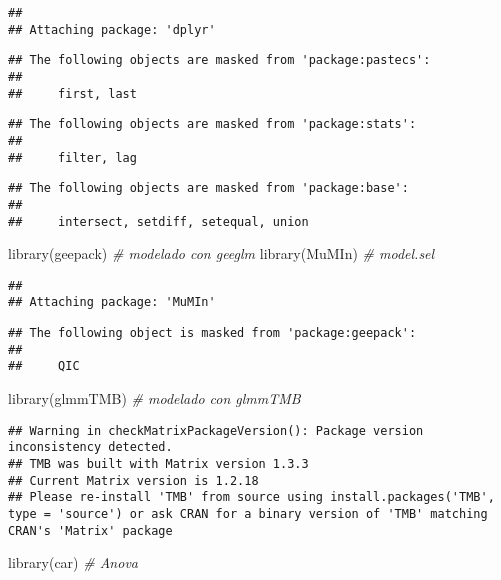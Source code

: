 \documentclass[
]{article}
\newenvironment{Shaded}{\begin{snugshade}}{\end{snugshade}}
\newcommand{\CommentTok}[1]{\textcolor[rgb]{0.56,0.35,0.01}{\textit{#1}}}
\newcommand{\FunctionTok}[1]{\textcolor[rgb]{0.00,0.00,0.00}{#1}}
\newcommand{\NormalTok}[1]{#1}
\begin{document}
\begin{verbatim}
## 
## Attaching package: 'dplyr'
\end{verbatim}

\begin{verbatim}
## The following objects are masked from 'package:pastecs':
## 
##     first, last
\end{verbatim}

\begin{verbatim}
## The following objects are masked from 'package:stats':
## 
##     filter, lag
\end{verbatim}

\begin{verbatim}
## The following objects are masked from 'package:base':
## 
##     intersect, setdiff, setequal, union
\end{verbatim}

\begin{Shaded}
\begin{Highlighting}[]
\FunctionTok{library}\NormalTok{(geepack)   }\CommentTok{\# modelado con geeglm}
\FunctionTok{library}\NormalTok{(MuMIn)     }\CommentTok{\# model.sel}
\end{Highlighting}
\end{Shaded}

\begin{verbatim}
## 
## Attaching package: 'MuMIn'
\end{verbatim}

\begin{verbatim}
## The following object is masked from 'package:geepack':
## 
##     QIC
\end{verbatim}

\begin{Shaded}
\begin{Highlighting}[]
\FunctionTok{library}\NormalTok{(glmmTMB)   }\CommentTok{\# modelado con glmmTMB}
\end{Highlighting}
\end{Shaded}

\begin{verbatim}
## Warning in checkMatrixPackageVersion(): Package version inconsistency detected.
## TMB was built with Matrix version 1.3.3
## Current Matrix version is 1.2.18
## Please re-install 'TMB' from source using install.packages('TMB', type = 'source') or ask CRAN for a binary version of 'TMB' matching CRAN's 'Matrix' package
\end{verbatim}

\begin{Shaded}
\begin{Highlighting}[]
\FunctionTok{library}\NormalTok{(car)       }\CommentTok{\# Anova}
\end{Highlighting}
\end{Shaded}
\end{document}
